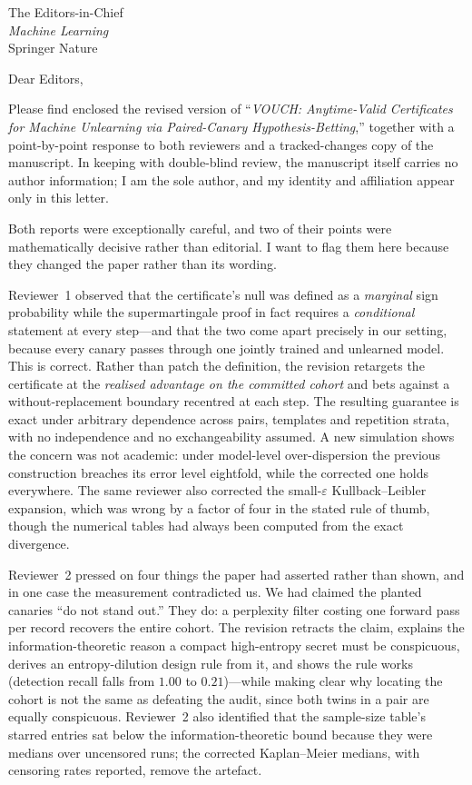 \documentclass[10pt,a4paper]{letter}
\date{3 September 2026}
\begin{document}
\begin{letter}{The Editors-in-Chief\\\emph{Machine Learning}\\Springer Nature}

\opening{Dear Editors,}

Please find enclosed the revised version of ``\emph{VOUCH: Anytime-Valid
Certificates for Machine Unlearning via Paired-Canary Hypothesis-Betting},''
together with a point-by-point response to both reviewers and a
tracked-changes copy of the manuscript. In keeping with double-blind review,
the manuscript itself carries no author information; I am the sole author, and
my identity and affiliation appear only in this letter.

Both reports were exceptionally careful, and two of their points were
mathematically decisive rather than editorial. I want to flag them here because
they changed the paper rather than its wording.

Reviewer~1 observed that the certificate's null was defined as a
\emph{marginal} sign probability while the supermartingale proof in fact
requires a \emph{conditional} statement at every step---and that the two come
apart precisely in our setting, because every canary passes through one jointly
trained and unlearned model. This is correct. Rather than patch the definition,
the revision retargets the certificate at the \emph{realised advantage on the
committed cohort} and bets against a without-replacement boundary recentred at
each step. The resulting guarantee is exact under arbitrary dependence across
pairs, templates and repetition strata, with no independence and no
exchangeability assumed. A new simulation shows the concern was not academic:
under model-level over-dispersion the previous construction breaches its error
level eightfold, while the corrected one holds everywhere. The same reviewer
also corrected the small-$\varepsilon$ Kullback--Leibler expansion, which was
wrong by a factor of four in the stated rule of thumb, though the numerical
tables had always been computed from the exact divergence.

Reviewer~2 pressed on four things the paper had asserted rather than shown, and
in one case the measurement contradicted us. We had claimed the planted canaries
``do not stand out.'' They do: a perplexity filter costing one forward pass per
record recovers the entire cohort. The revision retracts the claim, explains the
information-theoretic reason a compact high-entropy secret must be conspicuous,
derives an entropy-dilution design rule from it, and shows the rule works
(detection recall falls from $1.00$ to $0.21$)---while making clear why locating
the cohort is not the same as defeating the audit, since both twins in a pair
are equally conspicuous. Reviewer~2 also identified that the sample-size table's
starred entries sat below the information-theoretic bound because they were
medians over uncensored runs; the corrected Kaplan--Meier medians, with censoring
rates reported, remove the artefact.


\end{letter}
\end{document}
